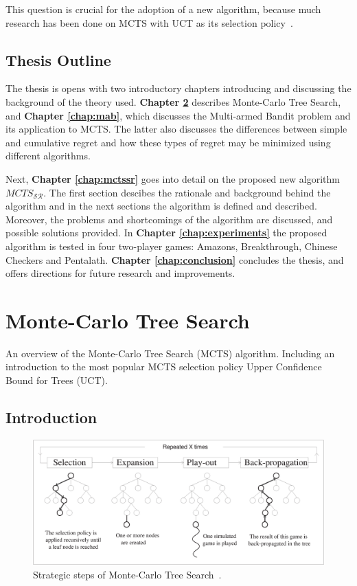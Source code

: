 \documentclass{kecsmstr}
\newcommand{\mctssr}{MCTS_{\mathcal{S}\mathcal{R}}}
\begin{document}
\noindent This question is crucial for the adoption of a new algorithm, because much research has been done on MCTS with UCT as its selection policy~.

\section{Thesis Outline}

The thesis is opens with two introductory chapters introducing and discussing the background of the theory used. \textbf{Chapter \ref{chap:mcts}} describes Monte-Carlo Tree Search, and \textbf{Chapter \ref{chap:mab}}, which discusses the Multi-armed Bandit problem and its application to MCTS. The latter also discusses the differences between simple and cumulative regret and how these types of regret may be minimized using different algorithms. 

Next, \textbf{Chapter \ref{chap:mctssr}} goes into detail on the proposed new algorithm $\mctssr$. The first section descibes the rationale and background behind the algorithm and in the next sections the algorithm is defined and described. Moreover, the problems and shortcomings of the algorithm are discussed, and possible solutions provided. In \textbf{Chapter \ref{chap:experiments}} the proposed algorithm is tested in four two-player games: Amazons, Breakthrough, Chinese Checkers and Pentalath. \textbf{Chapter \ref{chap:conclusion}} concludes the thesis, and offers directions for future research and improvements.

\chapter{Monte-Carlo Tree Search}
\label{chap:mcts}
\begin{chaptercontents} An overview of the Monte-Carlo Tree Search (MCTS) algorithm. Including an introduction to the most popular MCTS selection policy Upper Confidence Bound for Trees (UCT).
\end{chaptercontents}
\section{Introduction}

\begin{figure}[ht]
	\centering
	\includegraphics[width=.85\textwidth]{img/figure1.eps}
	\caption{Strategic steps of Monte-Carlo Tree Search~\protect{}.}
	\label{fig:mcts-algorithm}
\end{figure}
\end{document}
